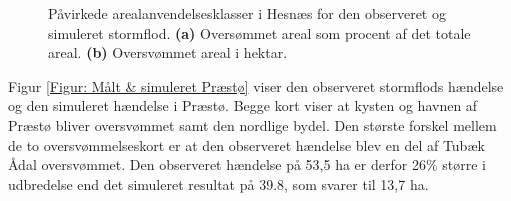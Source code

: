 \begin{figure}[H]
\begin{subfigure}[b]{0.5\textwidth}
        \caption{}
        \label{Subfig: Hektar Hesnæs}
    \end{subfigure}
    \caption{Påvirkede arealanvendelsesklasser i Hesnæs for den observeret og simuleret stormflod. \textbf{(a)} Oversømmet areal som procent af det totale areal. \textbf{(b)} Oversvømmet areal i hektar.}
    \label{Figur: Påvirket arealanvendelse Hesnæs}
\end{figure}


Figur \ref{Figur: Målt & simuleret Præstø} viser den observeret stormflods hændelse og den simuleret hændelse i Præstø. Begge kort viser at kysten og havnen af Præstø bliver oversvømmet samt den nordlige bydel. Den største forskel mellem de to oversvømmelseskort er at den observeret hændelse blev en del af Tubæk Ådal oversvømmet. Den observeret hændelse på 53,5 ha er derfor 26\% større i udbredelse end det simuleret resultat på 39.8, som svarer til 13,7 ha. 

